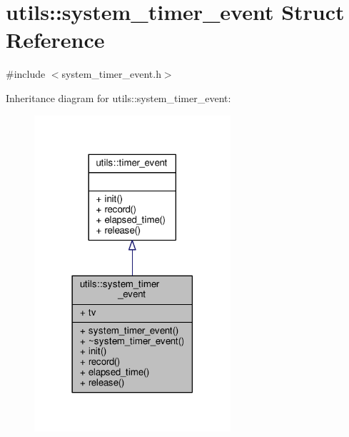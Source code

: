 \hypertarget{structutils_1_1system__timer__event}{\section{utils\-:\-:system\-\_\-timer\-\_\-event Struct Reference}
\label{structutils_1_1system__timer__event}
}


{\ttfamily \#include $<$system\-\_\-timer\-\_\-event.\-h$>$}



Inheritance diagram for utils\-:\-:system\-\_\-timer\-\_\-event\-:\nopagebreak
\begin{figure}[H]
\begin{center}
\leavevmode
\includegraphics[width=206pt]{structutils_1_1system__timer__event__inherit__graph}
\end{center}
\end{figure}


